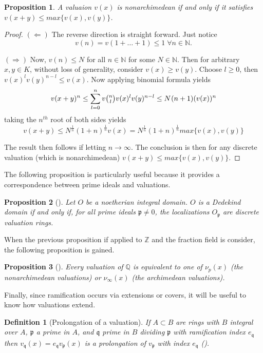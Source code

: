 \documentclass[paper=a4, fontsize=11pt]{scrartcl} %
\numberwithin{equation}{section} %
\numberwithin{figure}{section} %
\numberwithin{table}{section} %
\theoremstyle{break}
\newtheorem{defn}{Definition}
\newtheorem{prop}{Proposition}
\begin{document}
\begin{prop}
 A valuaion $v(x)$ is nonarchimedean if and only if it satisfies $v(x+y) \leq max\{v(x),v(y)\}$.
\end{prop}
\begin{proof}
$(\Leftarrow)$ The reverse direction is straight forward. Just notice 
$$v(n)=v(1+\ldots+1) \leq 1\; \forall n\in\mathbb{N}.$$

$(\Rightarrow)$ Now, $v(n) \leq N$ for all $n\in\mathbb{N}$ for some $N \in \mathbb{N}$. Then for arbitrary $x,y\in K$, without loss of generality, consider $v(x) \geq v(y)$. Choose $l \geq 0$, then $v(x)^{l}v(y)^{n-l} \leq v(x)$. Now applying binomial formula yields
$$
	v(x+y)^{n} \leq \sum_{l=0}^{n} v\tbinom{n}{l} v(x)^l v(y)^{n-l} \leq N^{}(n+1)(v(x))^n
$$
taking the $n^{th}$ root of both sides yields
$$
v(x+y) \leq N^{\frac{1}{n}}(1+n)^{\frac{1}{n}} v(x) = N^{\frac{1}{n}}(1+n)^{\frac{1}{n}} max\{v(x), v(y) \}
$$

The result then follows if letting $n \to \infty$. The conclusion is then for any discrete valuation (which is nonarchimedean) $v(x+y) \leq max \{v(x),v(y) \}$.
\end{proof}

The following proposition is particularly useful because it provides a correspondence between prime ideals and valuations.
\begin{prop}[\cite{Neukirch}]
Let $O$ be a noetherian integral domain. $O$ is a Dedekind domain if and only if, for all prime ideals $\mathfrak{p} \not= 0$, the localizations $O_\mathfrak{p}$ are discrete valuation rings.
\end{prop}
When the previous proposition if applied to $\mathbb{Z}$ and the fraction field is consider, the following proposition is gained.
\begin{prop}[\cite{Neukirch}]
Every valuation of $\mathbb{Q}$ is equivalent to one of $\nu_p(x)$ (the nonarchimedean valuations) or $\nu_\infty(x)$ (the archimedean valuations).
\end{prop}
Finally, since ramification occurs via extensions or covers, it will be useful to know how valuations extend.
\begin{defn}[Prolongation of a valuation]
If $A \subset B$ are rings with $B$ integral over $A$, $\mathfrak{p}$ a prime in $A$, and $\mathfrak{q}$ prime in $B$ dividing $\mathfrak{p}$ with ramification index $e_\mathfrak{q}$ then $v_\mathfrak{q}(x)=e_\mathfrak{q}v_\mathfrak{p}(x)$ is a prolongation of $v_\mathfrak{p}$ with index $e_\mathfrak{q}$ (\cite{Serre}).
\end{defn}
\end{document}
